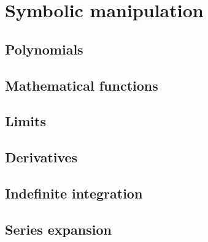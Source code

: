 
\chapter{Symbolic manipulation}

\section{Polynomials}

\section{Mathematical functions}

\section{Limits}

\section{Derivatives}

\section{Indefinite integration}

\section{Series expansion}
